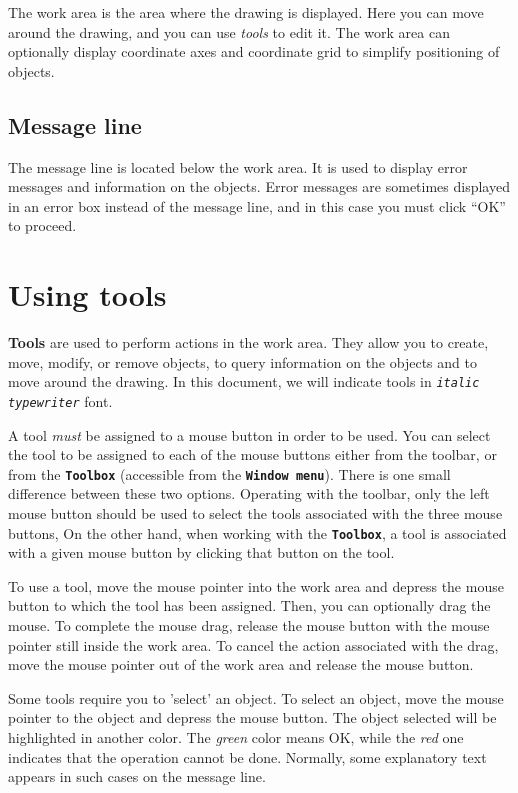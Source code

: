 \documentclass[12pt]{report}
\begin{document}
The work area is the area where the drawing is displayed. Here you can
move around the drawing, and you can use \textit{tools} to edit it. The
work area can optionally display coordinate axes and coordinate grid
to simplify positioning of objects.

\subsection{Message line }

The message line is located below the work area. It is used to display
error messages and information on the objects. Error messages are
sometimes displayed in an error box instead of the message line, and in
this case you must click ``OK'' to proceed.

\section{Using tools}

\textbf{Tools} are used to perform actions in the work area. They
allow you to create, move, modify, or remove objects, to query
information on the objects and to move around the drawing.
In this document, we will indicate tools in \textit{\texttt{italic
typewriter}} font.

A tool \textit{must} be assigned to a mouse button in order to be used. You can
select the tool to be assigned to each of the mouse buttons either from
the toolbar, or from the \textbf{\texttt{Toolbox}} (accessible from
the \textbf{\texttt{Window menu}}). There is one small
difference between these two options. Operating with the toolbar, 
only the left mouse button should be used to select the tools associated
with the three mouse buttons,
On the other hand, when working with the \textbf{\texttt{Toolbox}}, 
a tool is associated
with a given mouse button by clicking that button on the tool.

To use a tool, move the mouse pointer into the work area and depress
the mouse button to which the tool has been assigned. Then, you can
optionally drag the mouse. To complete the mouse drag, release the mouse button
with the mouse pointer still inside the work area. To cancel the
action associated with the drag, 
move the mouse pointer out of the work area and release the
mouse button.

Some tools require you to 'select' an object. To select an object,
move the mouse pointer to the object and depress the mouse button. The
object selected will be highlighted in another color. The
\textit{green} color means OK, while the \textit{red} one indicates
that the operation cannot be done. Normally, some explanatory text
appears in such cases on the message line.
\end{document}
